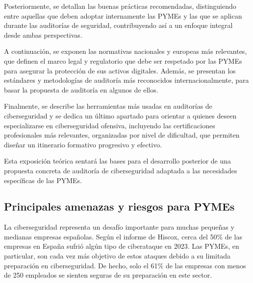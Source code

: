 \documentclass[a4paper, 10pt]{article}
\begin{document}
\par\vspace{0.5cm}

Posteriormente, se detallan las buenas prácticas recomendadas, distinguiendo entre aquellas que deben adoptar internamente las PYMEs y las que se aplican durante las auditorías de seguridad, contribuyendo así a un enfoque integral desde ambas perspectivas.

\par\vspace{0.5cm}

A continuación, se exponen las normativas nacionales y europeas más relevantes, que definen el marco legal y regulatorio que debe ser respetado por las PYMEs para asegurar la protección de sus activos 
digitales. Además, se presentan los estándares y metodologías de auditoría más reconocidos internacionalmente, para basar la propuesta de auditoría en algunos de ellos.

\par\vspace{0.5cm}


Finalmente, se describe las herramientas más usadas en auditorías de ciberseguridad y se dedica un último apartado para orientar a quienes deseen especializarse en ciberseguridad ofensiva, incluyendo las certificaciones profesionales más relevantes, organizadas por nivel de dificultad, que permiten diseñar un itinerario formativo progresivo y efectivo.
\par\vspace{0.5cm}

Esta exposición teórica sentará las bases para el desarrollo posterior de una propuesta concreta de auditoría de ciberseguridad adaptada a las necesidades específicas de las PYMEs.















\subsection{Principales amenazas y riesgos para PYMEs}

La ciberseguridad representa un desafío importante para muchas pequeñas y medianas empresas españolas. Según el informe de Hiscox, cerca del 50\% de las empresas en España sufrió algún tipo de ciberataque en 2023. Las PYMEs, en particular, son cada vez más objetivo de estos ataques debido a su limitada preparación en ciberseguridad. De hecho, solo el 61\% de las empresas con menos de 250 empleados se sienten seguras de su preparación en este sector. \cite{hiscox}
\par\vspace{0.5cm}
\end{document}
